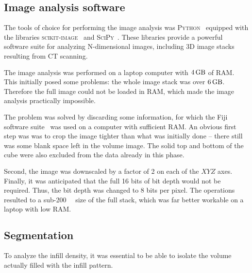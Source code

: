 \documentclass[a4paper,twoside,12pt]{article}
\begin{document}
\subsection{Image analysis software}
The tools of choice for performing the image analysis was \textsc{Python}~\cite{python} equipped with the libraries \textsc{scikit-image}~\cite{skimage} and \textsc{SciPy}~\cite{scipy}. These libraries provide a powerful software suite for analyzing N-dimensional images, including 3D image stacks resulting from CT scanning.

The image analysis was performed on a laptop computer with $\SI{4}{\giga\byte}$ of RAM. This initially posed some problems: the whole image stack was over $\SI{6}{\giga\byte}$. Therefore the full image could not be loaded in RAM, which made the image analysis practically impossible.

The problem was solved by discarding some information, for which the Fiji software suite~\cite{fiji} was used on a computer with sufficient RAM. An obvious first step was was to crop the image tighter than what was initially done -- there still was some blank space left in the volume image. The solid top and bottom of the cube were also excluded from the data already in this phase.

Second, the image was downscaled by a factor of 2 on each of the $XYZ$ axes. Finally, it was anticipated that the full 16 bits of bit depth would not be required. Thus, the bit depth was changed to 8 bits per pixel. The operations resulted to a sub-\SI{200}{\mega\byte} size of the full stack, which was far better workable on a laptop with low RAM.

\subsection{Segmentation}
To analyze the infill density, it was essential to be able to isolate the volume actually filled with the infill pattern.
\end{document}

